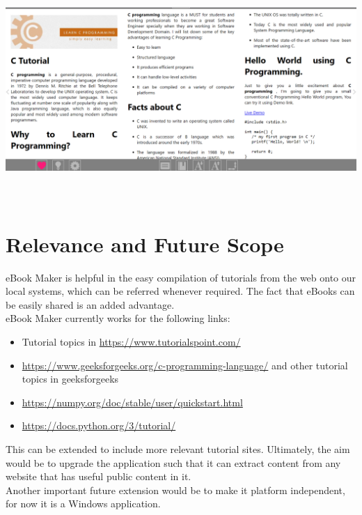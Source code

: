\documentclass[12pt,a4paper,titlepage]{article}
\begin{document}
\begin{enumerate}
\newline \\\includegraphics[width=\textwidth,height=8.5cm]{5.png}
\end{enumerate}
\section{\textbf{Relevance and Future Scope}}
eBook Maker is helpful in the easy compilation of tutorials from the web onto our local systems, which can be referred whenever required. The fact that eBooks can be easily shared is an added advantage. \\

eBook Maker currently works for the following links:
\begin{itemize}
    \item Tutorial topics in \url{https://www.tutorialspoint.com/}
    \item \url{https://www.geeksforgeeks.org/c-programming-language/} and other tutorial topics in geeksforgeeks
    \item \url{https://numpy.org/doc/stable/user/quickstart.html}
    \item \url{https://docs.python.org/3/tutorial/}
\end{itemize}
This can be extended to include more relevant tutorial sites. Ultimately, the aim would be to upgrade the application such that it can extract content from any website that has useful public content in it. 
\\Another important future extension would be to make it platform independent, for now it is a Windows application.
\end{document}
